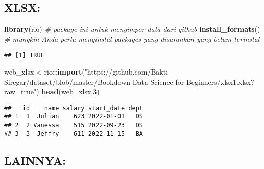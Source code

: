\documentclass[
]{book}
\newenvironment{Shaded}{\begin{snugshade}}{\end{snugshade}}
\newcommand{\CommentTok}[1]{\textcolor[rgb]{0.56,0.35,0.01}{\textit{#1}}}
\newcommand{\DecValTok}[1]{\textcolor[rgb]{0.00,0.00,0.81}{#1}}
\newcommand{\KeywordTok}[1]{\textcolor[rgb]{0.13,0.29,0.53}{\textbf{#1}}}
\newcommand{\NormalTok}[1]{#1}
\newcommand{\OperatorTok}[1]{\textcolor[rgb]{0.81,0.36,0.00}{\textbf{#1}}}
\newcommand{\StringTok}[1]{\textcolor[rgb]{0.31,0.60,0.02}{#1}}
\begin{document}
\hypertarget{xlsx}{%
\subsection{XLSX:}\label{xlsx}}

\begin{Shaded}
\begin{Highlighting}[]
\KeywordTok{library}\NormalTok{(rio)                                       }\CommentTok{# package ini untuk mengimpor data dari github}
\KeywordTok{install_formats}\NormalTok{()                                  }\CommentTok{# mungkin Anda perlu menginstal packages yang disarankan yang belum terinstal}
\end{Highlighting}
\end{Shaded}

\begin{verbatim}
## [1] TRUE
\end{verbatim}

\begin{Shaded}
\begin{Highlighting}[]
\NormalTok{web_xlsx <-rio}\OperatorTok{::}\KeywordTok{import}\NormalTok{(}\StringTok{"https://github.com/Bakti-Siregar/dataset/blob/master/Bookdown-Data-Science-for-Beginners/xlsx1.xlsx?raw=true"}\NormalTok{)}
\KeywordTok{head}\NormalTok{(web_xlsx,}\DecValTok{3}\NormalTok{)}
\end{Highlighting}
\end{Shaded}

\begin{verbatim}
##   id    name salary start_date dept
## 1  1  Julian    623 2022-01-01   DS
## 2  2 Vanessa    515 2022-09-23   DS
## 3  3  Jeffry    611 2022-11-15   BA
\end{verbatim}

\hypertarget{lainnya}{%
\subsection{LAINNYA:}\label{lainnya}}
\end{document}
